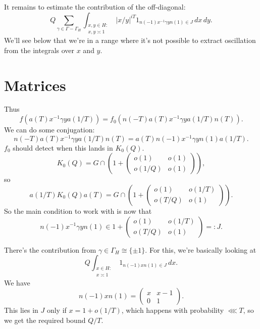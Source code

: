 \documentclass[reqno]{amsart} 
\begin{document}
It remains to estimate the contribution of the off-diagonal:
\begin{equation*}
  Q
  \sum _{\gamma \in \Gamma - \Gamma_H}
  \int _{
    \substack{
      x, y \in H :  \\
       x, y \asymp 1
    }
  }
  \lvert x/y \rvert^{i T}
  1 _{n (- 1 ) x ^{-1} \gamma y n (1) \in J} \, d x \, d y.
\end{equation*}
We'll see below that we're in a range where it's not possible to extract oscillation from the integrals over $x$ and $y$.

\section{Matrices}\label{sec:20230522180034}
Thus
\begin{equation*}
  f (a(T) x ^{-1}  \gamma y a(1/T) )
  =
  f_0 (n(-T) a(T) x ^{-1}  \gamma y a(1/T)  n(T)).
\end{equation*}
We can do some conjugation:
\begin{equation*}
  n(-T) a(T) x ^{-1}  \gamma y a(1/T)  n(T)
  =
  a(T) n(-1) x ^{-1}  \gamma y n(1) a(1/T).
\end{equation*}
$f_0$ should detect when this lands in $K_0(Q)$.
\begin{equation*}
  K_0(Q) =
  G \cap 
  \left( 1 + \begin{pmatrix}
    o(1) & o(1) \\
    o(1/Q) & o(1)
  \end{pmatrix}  \right),
\end{equation*}
so
\begin{equation*}
  a(1/T) K_0(Q) a(T)
  =
  G \cap 
  \left( 1 +
    \begin{pmatrix}
      o(1) & o(1/T) \\
      o(T/Q) & o(1)
    \end{pmatrix}  \right).
\end{equation*}
So the main condition to work with is now that
\begin{equation*}
  n(-1) x ^{-1} \gamma y n (1) \in
  1 +
  \begin{pmatrix}
    o(1) & o(1/T) \\
    o(T/Q) & o(1)
  \end{pmatrix} =: J.
\end{equation*}

There's the contribution from $\gamma \in \Gamma_H \cong \{\pm 1\}$.  For this, we're basically looking at
\begin{equation*}
  Q
  \int _{
    \substack{
      x \in H :  \\
       x \asymp  1
    }
  }
  1 _{n(-1) x n (1) \in J} \, d x.
\end{equation*}
We have
\begin{equation*}
  n (-1) x n (1)
  =
  \begin{pmatrix}
    x & x-1 \\
    0 & 1
  \end{pmatrix}.
\end{equation*}
This lies in $J$ only if $x = 1 + o(1/T)$, which happens with probability $\lll T$, so we get the required bound $Q/T$.
\end{document}

